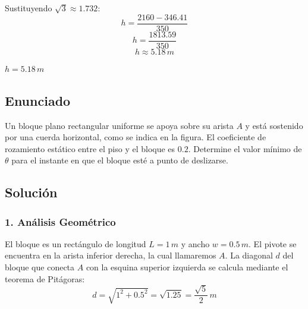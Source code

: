 \documentclass[12pt, a4paper]{article}
\begin{document}
Sustituyendo $\sqrt{3} \approx 1.732$:
$$h = \frac{2160 - 346.41}{350}$$
$$h = \frac{1813.59}{350}$$
$$h \approx 5.18 \, \si{m}$$

\begin{tcolorbox}[colback=green!5!white, colframe=green!50!black, title=Respuesta Final]
\centering \Large $h = 5.18 \, \si{m}$
\end{tcolorbox}

\newpage

\subsection*{Enunciado}
Un bloque plano rectangular uniforme se apoya sobre su arista $A$ y está sostenido por una cuerda horizontal, como se indica en la figura. El coeficiente de rozamiento estático entre el piso y el bloque es $0.2$. Determine el valor mínimo de $\theta$ para el instante en que el bloque esté a punto de deslizarse.

\begin{center}
\end{center}

\subsection*{Solución}

\subsubsection*{1. Análisis Geométrico}
El bloque es un rectángulo de longitud $L = 1 \, \si{m}$ y ancho $w = 0.5 \, \si{m}$.
El pivote se encuentra en la arista inferior derecha, la cual llamaremos $A$.
La diagonal $d$ del bloque que conecta $A$ con la esquina superior izquierda se calcula mediante el teorema de Pitágoras:
$$d = \sqrt{1^2 + 0.5^2} = \sqrt{1.25} = \frac{\sqrt{5}}{2} \, \si{m}$$
\end{document}

